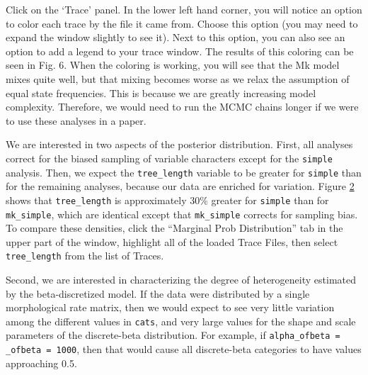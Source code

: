 Click on the `Trace' panel.
In the lower left hand corner, you will notice an option to color each trace by the file it came from.
Choose this option (you may need to expand the window slightly to see it).
Next to this option, you can also see an option to add a legend to your trace window.
The results of this coloring can be seen in Fig. 6.
When the coloring is working, you will see that the Mk model mixes quite well, but that mixing becomes worse as we relax the assumption of equal state frequencies.
This is because we are greatly increasing model complexity.
Therefore, we would need to run the MCMC chains longer if we were to use these analyses in a paper. \par

\begin{figure}[h!]
\label{fig:module-gm}
\end{figure}


We are interested in two aspects of the posterior distribution.
First, all analyses correct for the biased sampling of variable characters except for the {\tt simple} analysis.
Then, we expect the {\tt tree\_length} variable to be greater for {\tt simple} than for the remaining analyses, because our data are enriched for variation.
Figure \ref{fig:tracer_tree_length} shows that {\tt tree\_length} is approximately 30\% greater for {\tt simple} than for {\tt mk\_simple}, which are identical except that {\tt mk\_simple} corrects for sampling bias.
To compare these densities, click the ``Marginal Prob Distribution'' tab in the upper part of the window, highlight all of the loaded Trace Files, then select {\tt tree\_length} from the list of Traces.

\begin{figure}[h!]
\label{fig:tracer_tree_length}
\end{figure}

Second, we are interested in characterizing the degree of heterogeneity estimated by the beta-discretized model.
If the data were distributed by a single morphological rate matrix, then we would expect to see very little variation among the different values in {\tt cats}, and very large values for the shape and scale parameters of the discrete-beta distribution.
For example, if {\tt alpha\_ofbeta = \beta\_ofbeta = 1000}, then that would cause all discrete-beta categories to have values approaching 0.5.

